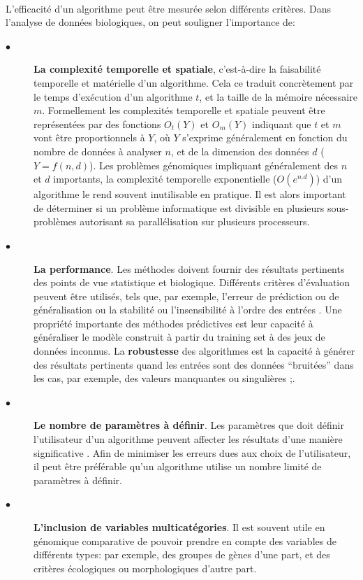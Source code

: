 \\
L'efficacité d'un algorithme peut être mesurée selon différents critères. Dans l'analyse de données biologiques, on peut souligner l'importance de: 
\begin{description}
\item[$\bullet$] \textbf{La complexité temporelle et spatiale}, c'est-à-dire la faisabilité temporelle et matérielle d'un algorithme. Cela ce traduit concrètement par le temps d'exécution d'un algorithme $t$, et la taille de la mémoire nécessaire $m$. Formellement les complexités temporelle et spatiale peuvent être représentées par des fonctions $O_{t}(Y)$ et $O_{m}(Y)$ indiquant que $t$ et $m$ vont être proportionnels à $Y$, où $Y$ s'exprime généralement en fonction du nombre de données à analyser $n$, et de la dimension des données $d$ ($Y=f(n,d)$). Les problèmes génomiques impliquant généralement des $n$ et $d$ importants, la complexité temporelle exponentielle ($O(e^{n.d}) $) d'un algorithme le rend souvent inutilisable en pratique. Il est alors important de déterminer si un problème informatique est divisible en plusieurs sous-problèmes autorisant sa parallélisation sur plusieurs processeurs. 
\item[$\bullet$] \textbf{La performance}. Les méthodes doivent fournir des résultats pertinents des points de vue statistique et biologique. Différents critères d'évaluation peuvent être utilisés, tels que, par exemple, l'erreur de prédiction ou de généralisation \citep{izenman2008modern} ou la stabilité ou l'insensibilité à l'ordre des entrées \citep{Andreopoulos2009}. Une propriété importante des méthodes prédictives est leur capacité à généraliser le modèle construit à partir du training set à des jeux de données inconnus. La \textbf{robustesse} des algorithmes est la capacité à générer des résultats pertinents quand les entrées sont des données “bruitées” dans les cas, par exemple, des valeurs manquantes ou singulières \citep[Chap. 8]{han2012data};\citep{Andreopoulos2009}. 

\item[$\bullet$] \textbf{Le nombre de paramètres à définir}. Les paramètres que doit définir l'utilisateur d'un algorithme peuvent affecter les résultats d'une manière significative \citep{Andreopoulos2009}. Afin de minimiser les erreurs dues aux choix de l'utilisateur, il peut être préférable qu'un algorithme utilise un nombre limité de paramètres à définir.

\item[$\bullet$] \textbf{ L'inclusion de variables multicatégories}. Il est souvent utile en génomique comparative de pouvoir prendre en compte des variables de différents types: par exemple, des groupes de gènes d'une part, et des critères écologiques ou morphologiques d'autre part. 
\end{description}

